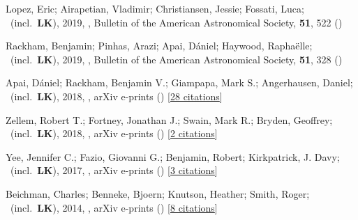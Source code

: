 \item[{\color{numcolor}\scriptsize6}] Lopez, Eric; Airapetian, Vladimir; Christiansen, Jessie; Fossati, Luca; \etal\ (incl.\ \textbf{LK}), 2019, , Bulletin of the American Astronomical Society, \textbf{51}, 522 ()

\item[{\color{numcolor}\scriptsize5}] Rackham, Benjamin; Pinhas, Arazi; Apai, D{\'a}niel; Haywood, Rapha{\"e}lle; \etal\ (incl.\ \textbf{LK}), 2019, , Bulletin of the American Astronomical Society, \textbf{51}, 328 ()

\item[{\color{numcolor}\scriptsize4}] Apai, D{\'a}niel; Rackham, Benjamin V.; Giampapa, Mark S.; Angerhausen, Daniel; \etal\ (incl.\ \textbf{LK}), 2018, , arXiv e-prints () [\href{https://ui.adsabs.harvard.edu/abs/2018arXiv180308708A}{28 citations}]

\item[{\color{numcolor}\scriptsize3}] Zellem, Robert T.; Fortney, Jonathan J.; Swain, Mark R.; Bryden, Geoffrey; \etal\ (incl.\ \textbf{LK}), 2018, , arXiv e-prints () [\href{https://ui.adsabs.harvard.edu/abs/2018arXiv180307163Z}{2 citations}]

\item[{\color{numcolor}\scriptsize2}] Yee, Jennifer C.; Fazio, Giovanni G.; Benjamin, Robert; Kirkpatrick, J. Davy; \etal\ (incl.\ \textbf{LK}), 2017, , arXiv e-prints () [\href{https://ui.adsabs.harvard.edu/abs/2017arXiv171004194Y}{3 citations}]

\item[{\color{numcolor}\scriptsize1}] Beichman, Charles; Benneke, Bjoern; Knutson, Heather; Smith, Roger; \etal\ (incl.\ \textbf{LK}), 2014, , arXiv e-prints () [\href{https://ui.adsabs.harvard.edu/abs/2014arXiv1411.1754B}{8 citations}]